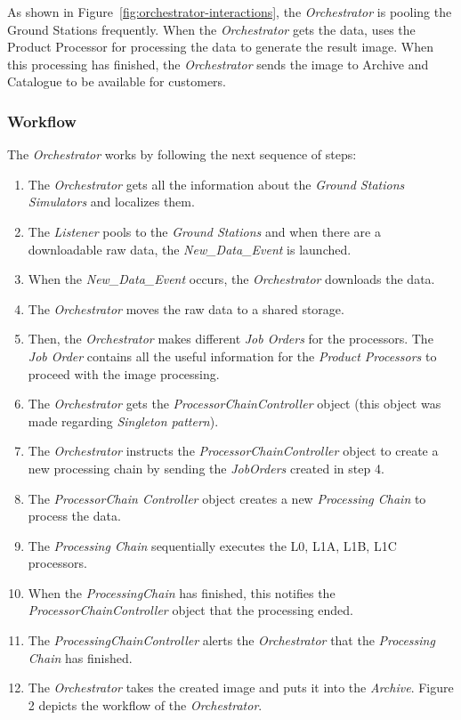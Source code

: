 As shown in Figure~\ref{fig:orchestrator-interactions}, the \emph{Orchestrator} is
pooling the Ground Stations frequently. When the \emph{Orchestrator} gets the data,
uses the Product Processor for processing the data to generate the result
image. When this processing has finished, the \emph{Orchestrator} sends the image to
Archive and Catalogue to be available for customers.

\subsubsection{Workflow}

The \emph{Orchestrator} works by following the next sequence of steps:
\begin{enumerate}
\item The \emph{Orchestrator} gets all the information about the \emph{Ground
    Stations Simulators} and localizes them.
\item The \emph{Listener} pools to the \emph{Ground Stations} and when there are
  a downloadable raw data, the \emph{New\_Data\_Event} is launched.
\item  When the \emph{New\_Data\_Event} occurs, the \emph{Orchestrator} downloads the data.
\item  The \emph{Orchestrator} moves the raw data to a shared storage.
\item Then, the \emph{Orchestrator} makes different \emph{Job Orders} for the processors. The \emph{Job Order} contains all the useful information for the \emph{Product Processors} to proceed with the image processing.
\item The \emph{Orchestrator} gets the \emph{ProcessorChainController} object (this object was made regarding \emph{Singleton pattern}).
\item The \emph{Orchestrator} instructs the \emph{ProcessorChainController} object to create a new processing chain by sending the \emph{JobOrders} created in step 4.
\item The \emph{ProcessorChain Controller} object creates a new \emph{Processing Chain} to process the data.
\item The \emph{Processing Chain} sequentially executes the L0, L1A, L1B, L1C processors. 
\item When the \emph{ProcessingChain} has finished, this notifies the \emph{ProcessorChainController} object that the processing ended.
\item The \emph{ProcessingChainController} alerts the \emph{Orchestrator} that the \emph{Processing Chain} has finished.
\item The \emph{Orchestrator} takes the created image and puts it into the \emph{Archive}.
Figure 2 depicts the workflow of the \emph{Orchestrator}. 
\end{enumerate}